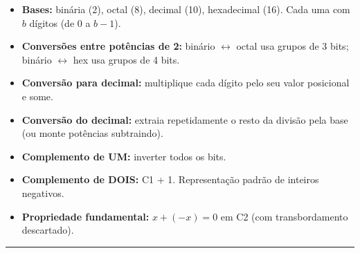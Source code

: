 \documentclass[11pt,a4paper]{article}
\begin{document}
\begin{itemize}[leftmargin=*,itemsep=0pt]
  \item \textbf{Bases:} bin\'aria (2), octal (8), decimal (10), hexadecimal (16). Cada uma com $b$ d\'igitos (de 0 a $b-1$).
  \item \textbf{Convers\~oes entre pot\^encias de 2:} bin\'ario $\leftrightarrow$ octal usa grupos de 3 bits; bin\'ario $\leftrightarrow$ hex usa grupos de 4 bits.
  \item \textbf{Convers\~ao para decimal:} multiplique cada d\'igito pelo seu valor posicional e some.
  \item \textbf{Convers\~ao do decimal:} extraia repetidamente o resto da divis\~ao pela base (ou monte pot\^encias subtraindo).
  \item \textbf{Complemento de UM:} inverter todos os bits.
  \item \textbf{Complemento de DOIS:} C1 + 1. Representa\c{c}\~ao padr\~ao de inteiros negativos.
  \item \textbf{Propriedade fundamental:} $x + (-x) = 0$ em C2 (com transborda\-mento descartado).
\end{itemize}

\vspace{1em}
\begin{center}\rule{0.5\textwidth}{0.4pt}\end{center}
\end{document}
